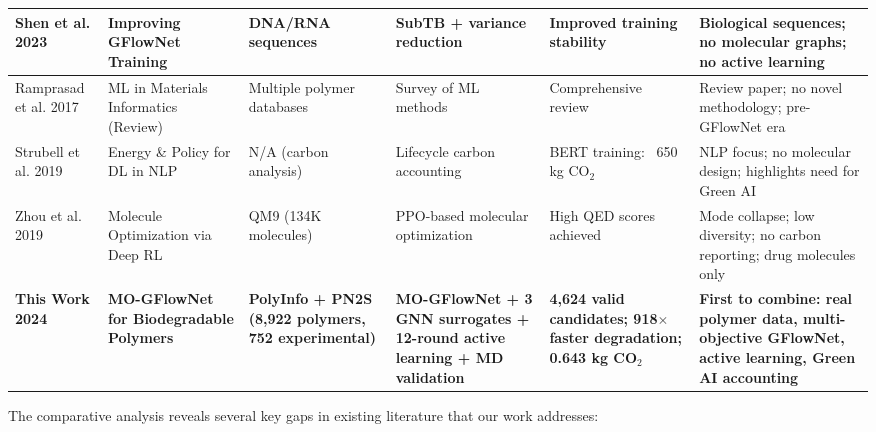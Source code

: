 \documentclass[twocolumn,10pt]{article}
\begin{document}
\begin{table}[!t]
{\begin{tabular}{@{}p{3cm}p{2.5cm}p{2cm}p{3.5cm}p{3cm}p{3cm}@{}}
Shen et al. 2023~\cite{shen2023towards} & Improving GFlowNet Training & DNA/RNA sequences & SubTB + variance reduction & Improved training stability & Biological sequences; no molecular graphs; no active learning \\
\midrule

Ramprasad et al. 2017~\cite{ramprasad2017machine} & ML in Materials Informatics (Review) & Multiple polymer databases & Survey of ML methods & Comprehensive review & Review paper; no novel methodology; pre-GFlowNet era \\
\midrule

Strubell et al. 2019~\cite{strubell2019energy} & Energy \& Policy for DL in NLP & N/A (carbon analysis) & Lifecycle carbon accounting & BERT training: ~650 kg CO$_2$ & NLP focus; no molecular design; highlights need for Green AI \\
\midrule

Zhou et al. 2019~\cite{zhou2019optimization} & Molecule Optimization via Deep RL & QM9 (134K molecules) & PPO-based molecular optimization & High QED scores achieved & Mode collapse; low diversity; no carbon reporting; drug molecules only \\
\midrule

\textbf{This Work 2024} & \textbf{MO-GFlowNet for Biodegradable Polymers} & \textbf{PolyInfo + PN2S (8,922 polymers, 752 experimental)} & \textbf{MO-GFlowNet + 3 GNN surrogates + 12-round active learning + MD validation} & \textbf{4,624 valid candidates; 918$\times$ faster degradation; 0.643 kg CO$_2$} & \textbf{First to combine: real polymer data, multi-objective GFlowNet, active learning, Green AI accounting} \\
\bottomrule
\end{tabular}
}
\end{table}

The comparative analysis reveals several key gaps in existing literature that our work addresses:
\end{document}
